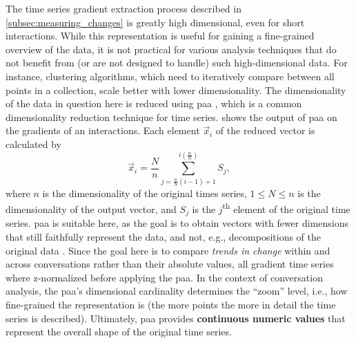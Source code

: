 The time series gradient extraction process described in \cref{subsec:measuring_changes} is greatly high dimensional, even for short interactions.
While this representation is useful for gaining a fine-grained overview of the data, it is not practical for various analysis techniques that do not benefit from (or are not designed to handle) such high-dimensional data.
For instance, clustering algorithms, which need to iteratively compare between all points in a collection, scale better with lower dimensionality.
The dimensionality of the data in question here is reduced using \acl{paa} \citep[\acl{paa};][]{Keogh2001dimensionality}, which is a common dimensionality reduction technique for time series.
 shows the output of \ac{paa} on the gradients of an interactions.
Each element $\vec{x}_i$ of the reduced vector is calculated by
%
\begin{equation}
	\label{eq:paa}
	\vec{x}_i = \frac{N}{n} \sum_{j=\frac{n}{N}(i-1)+1}^{i(\frac{n}{N})} S_j,
\end{equation}
\noindent
%
where $n$ is the dimensionality of the original times series, $1 \leq N \leq n$ is the dimensionality of the output vector, and $S_j$ is the $j$\textsuperscript{th} element of the original time series.
\Ac{paa} is suitable here, as the goal is to obtain vectors with fewer dimensions that still faithfully represent the data, and not, e.g., decompositions of the original data \citep[cf.\ method survey in][pp.~271-275]{Keogh2001dimensionality}.
Since the goal here is to compare \emph{trends in change} within and across conversations rather than their absolute values, all gradient time series where z-normalized before applying the \ac{paa}.
In the context of conversation analysis, the \ac{paa}'s dimensional cardinality determines the \enquote{zoom} level, i.e., how fine-grained the representation is (the more points the more in detail the time series is described).
Ultimately, \ac{paa} provides \textbf{continuous numeric values} that represent the overall shape of the original time series.
%
